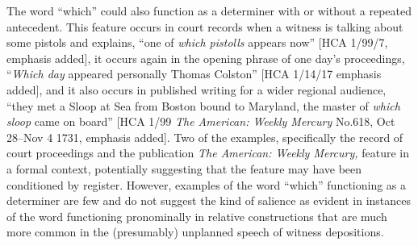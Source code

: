 The word “which” could also function as a  determiner with or without a repeated  antecedent. This feature occurs in court records when a witness is talking about some pistols and explains, “one of \textit{which pistolls} appears now” [HCA 1/99/7, emphasis added], it occurs again in the opening phrase of one day’s proceedings, “\textit{Which day} appeared personally Thomas Colston” [HCA 1/14/17 emphasis added], and it also occurs in published writing for a wider regional audience, “they met a Sloop at Sea from Boston bound to Maryland, the master of \textit{which sloop} came on board” [HCA 1/99 \textit{The American: Weekly Mercury} No.618, Oct 28–Nov 4 1731, emphasis added]. Two of the examples, specifically the record of court proceedings and the publication \textit{The American: Weekly Mercury,} feature in a formal context, potentially suggesting that the feature may have been conditioned by register. However, examples of the word “which” functioning as a determiner are few and do not suggest the kind of salience as evident in instances of the word functioning pronominally in relative constructions that are much more common in the (presumably) unplanned speech of witness depositions. 

